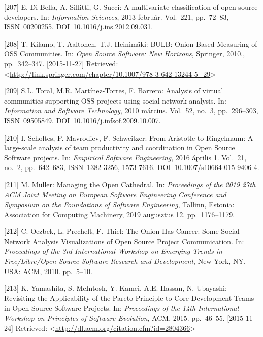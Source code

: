 \documentclass[12pt,magyar,a4paper,oneside]{scrreprt}
\newenvironment{cslreferences}%
  {}%
  {\par}
\begin{document}
\begin{cslreferences}
\leavevmode\hypertarget{ref-di_bella_multivariate_2013}{}%
{[}207{]} E. Di Bella, A. Sillitti, G. Succi: A multivariate
classification of open source developers. In: \emph{Information
Sciences}, 2013 február. Vol.~221, pp.~72--83, ISSN~00200255.
DOI~\href{https://doi.org/10.1016/j.ins.2012.09.031}{10.1016/j.ins.2012.09.031}.

\leavevmode\hypertarget{ref-kilamo_bulb_2010}{}%
{[}208{]} T. Kilamo, T. Aaltonen, T.J. Heinimäki: BULB: Onion-Based
Measuring of OSS Communities. In: \emph{Open Source Software: New
Horizons}, Springer, 2010., pp.~342--347. {[}2015-11-27{]} Retrieved:
\textless{}\url{http://link.springer.com/chapter/10.1007/978-3-642-13244-5_29}\textgreater{}

\leavevmode\hypertarget{ref-toral_analysis_2010}{}%
{[}209{]} S.L. Toral, M.R. Martínez-Torres, F. Barrero: Analysis of
virtual communities supporting OSS projects using social network
analysis. In: \emph{Information and Software Technology}, 2010 március.
Vol.~52, no.~3, pp.~296--303, ISSN~09505849.
DOI~\href{https://doi.org/10.1016/j.infsof.2009.10.007}{10.1016/j.infsof.2009.10.007}.

\leavevmode\hypertarget{ref-scholtes_aristotle_2016}{}%
{[}210{]} I. Scholtes, P. Mavrodiev, F. Schweitzer: From Aristotle to
Ringelmann: A large-scale analysis of team productivity and coordination
in Open Source Software projects. In: \emph{Empirical Software
Engineering}, 2016 április 1. Vol.~21, no.~2, pp.~642--683,
ISSN~1382-3256, 1573-7616.
DOI~\href{https://doi.org/10.1007/s10664-015-9406-4}{10.1007/s10664-015-9406-4}.

\leavevmode\hypertarget{ref-muller_managing_2019}{}%
{[}211{]} M. Müller: Managing the Open Cathedral. In: \emph{Proceedings
of the 2019 27th ACM Joint Meeting on European Software Engineering
Conference and Symposium on the Foundations of Software Engineering},
Tallinn, Estonia: Association for Computing Machinery, 2019 augusztus
12. pp.~1176--1179.

\leavevmode\hypertarget{ref-oezbek_onion_2010}{}%
{[}212{]} C. Oezbek, L. Prechelt, F. Thiel: The Onion Has Cancer: Some
Social Network Analysis Visualizations of Open Source Project
Communication. In: \emph{Proceedings of the 3rd International Workshop
on Emerging Trends in Free/Libre/Open Source Software Research and
Development}, New York, NY, USA: ACM, 2010. pp.~5--10.

\leavevmode\hypertarget{ref-yamashita_revisiting_2015}{}%
{[}213{]} K. Yamashita, S. McIntosh, Y. Kamei, A.E. Hassan, N. Ubayashi:
Revisiting the Applicability of the Pareto Principle to Core Development
Teams in Open Source Software Projects. In: \emph{Proceedings of the
14th International Workshop on Principles of Software Evolution}, ACM,
2015. pp.~46--55. {[}2015-11-24{]} Retrieved:
\textless{}\url{http://dl.acm.org/citation.cfm?id=2804366}\textgreater{}


\end{cslreferences}
\end{document}

